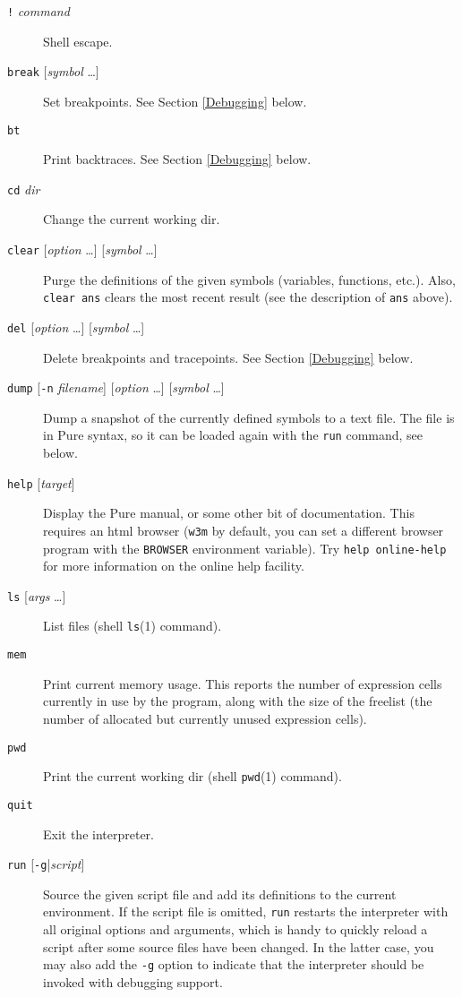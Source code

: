 \documentclass[a4paper,12pt]{article}
\newcommand{\nt}[1]{\textrm{\textit{#1\/}}}
\begin{document}
\begin{description}
\item[\rm\texttt{!} \nt{command}] Shell escape.
\item[\rm\texttt{break} {[\nt{symbol} \ldots{}]}] Set breakpoints. See Section \ref{Debugging} below.
\item[\rm\texttt{bt}] Print backtraces. See Section \ref{Debugging} below.
\item[\rm\texttt{cd} \nt{dir}] Change the current working dir.
\item[\rm\texttt{clear} {[\nt{option} \ldots{}]} {[\nt{symbol} \ldots{}]}] Purge the definitions of the given symbols (variables, functions, etc.). Also, \verb|clear ans| clears the most recent result (see the description of \verb|ans| above).
\item[\rm\texttt{del} {[\nt{option} \ldots{}]} {[\nt{symbol} \ldots{}]}] Delete breakpoints and tracepoints. See Section \ref{Debugging} below.
\item[\rm\texttt{dump} {[\texttt{-n} \nt{filename}]} {[\nt{option} \ldots{}]} {[\nt{symbol} \ldots{}]}] Dump a snapshot of the currently defined symbols to a text file. The file is in Pure syntax, so it can be loaded again with the \texttt{run} command, see below.
\item[\rm\texttt{help} {[\nt{target}]}] Display the Pure manual, or some other bit of documentation. This requires an html browser (\texttt{w3m} by default, you can set a different browser program with the \texttt{BROWSER} environment variable). Try \verb|help online-help| for more information on the online help facility.
\item[\rm\texttt{ls} {[\nt{args} \ldots{}]}] List files (shell \texttt{ls}(1) command).
\item[\rm\texttt{mem}] Print current memory usage. This reports the number of expression cells currently in use by the program, along with the size of the freelist (the number of allocated but currently unused expression cells).
\item[\rm\texttt{pwd}] Print the current working dir (shell \texttt{pwd}(1) command).
\item[\rm\texttt{quit}] Exit the interpreter.
\item[\rm\texttt{run} {[\texttt{-g}|\nt{script}]}] Source the given script file and add its definitions to the current environment. If the script file is omitted, \texttt{run} restarts the interpreter with all original options and arguments, which is handy to quickly reload a script after some source files have been changed. In the latter case, you may also add the \texttt{-g} option to indicate that the interpreter should be invoked with debugging support.

\end{description}
\end{document}
